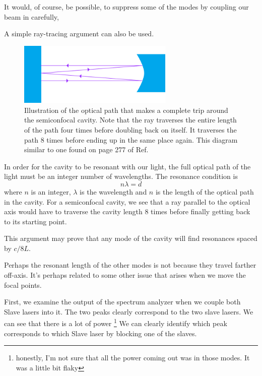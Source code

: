 It would, of course, be possible, to suppress some of the modes by coupling our beam in carefully, 

A simple ray-tracing argument can also be used. 
\begin{figure}
\centerline{\includegraphics[height=3cm]{spectrum_analyzer_path.png}}
\caption{Illustration of the optical path that makes a complete trip around the semiconfocal cavity. Note that the ray traverses the entire length of the path four times before doubling back on itself. It traverses the path 8 times before ending up in the same place again. This diagram similar to one found on page 277 of Ref.\ \cite{lasersMilonniEberly}}
\end{figure}

In order for the cavity to be resonant with our light, the full optical path of the light must be an integer number of wavelengths. The resonance condition is 
\begin{equation}
n \lambda = d
\end{equation}
where $n$ is an integer, $\lambda$ is the wavelength and $n$ is the length of the optical path in the cavity. 
For a semiconfocal cavity, we see that a ray parallel to the optical axis would have to traverse the cavity length 8 times before finally getting back to its starting point. 

This argument may prove that any mode of the cavity will find resonances spaced by $c/8L$.




Perhaps the resonant length of the other modes is not because they travel farther off-axis. It's perhaps related to some other issue that arises when we move the focal points.




First, we examine the output of the spectrum analyzer when we couple both Slave lasers into it. 
The two peaks clearly correspond to the two slave lasers. We can see that there is a lot of power \footnote{honestly, I'm not sure that all the power coming out was in those modes. It was a little bit flaky}
We can clearly identify which peak corresponds to which Slave laser by blocking one of the slaves. 

